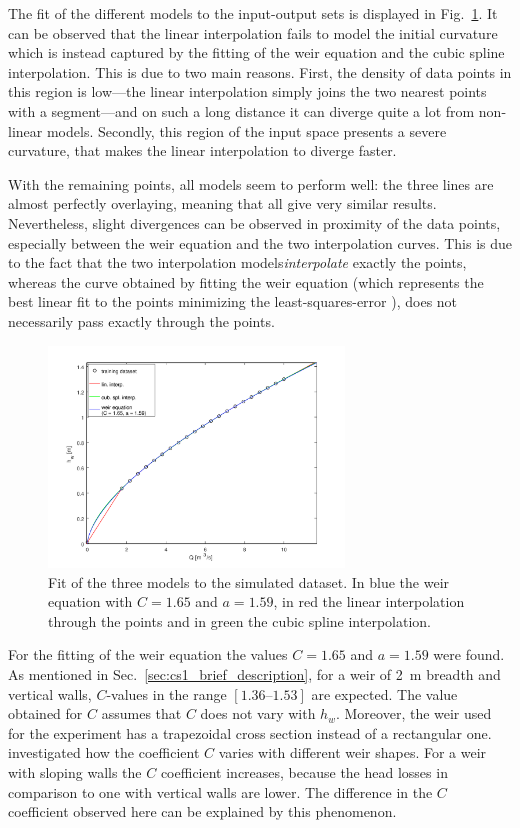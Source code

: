 The fit of the different models to the input-output sets is displayed in Fig.~\ref{fig:fitting_results}.
It can be observed that the linear interpolation fails to model the initial curvature which is instead captured by the fitting of the weir equation and the cubic spline interpolation.
This is due to two main reasons. 
First, the density of data points in this region is low---the linear interpolation simply joins the two nearest points with a segment---and on such a long distance it can diverge quite a lot from non-linear models.
Secondly, this region of the input space presents a severe curvature, that makes the linear interpolation to diverge faster.

With the remaining points, all models seem to perform well: the three lines are almost perfectly overlaying, meaning that all give very similar results.
Nevertheless, slight divergences can be observed in proximity of the data points, especially between the weir equation and the two interpolation curves. This is due to the fact that the two interpolation models\emph{interpolate} exactly the points, whereas the curve obtained by fitting the weir equation (which represents the best linear fit to the points minimizing the least-squares-error ), does not necessarily pass exactly through the points.

\begin{figure}[h]
  \centering
  \includegraphics[width=0.7\textwidth]{Figures/fitting_results.png}
  \caption{Fit of the three models to the simulated dataset. In blue the weir equation with $C = \num{1.65}$ and $a = \num{1.59}$, in red the linear interpolation through the points and in green the cubic spline interpolation.}
  \label{fig:fitting_results}
\end{figure}

For the fitting of the weir equation the values $C = 1.65$ and $a = 1.59$ were found.
As mentioned in Sec.~\ref{sec:cs1_brief_description}, for a weir of \SI{2}{\m} breadth and vertical walls, $C$-values in the range $[\numrange{1.36}{1.53}]$ are expected.
The value obtained for $C$ assumes that $C$ does not vary with $h_w$.
Moreover, the weir used for the experiment has a trapezoidal cross section instead of a rectangular one.
\cite{tracy_discharge_1957} investigated how the coefficient $C$ varies with different weir shapes.
For a weir with sloping walls the $C$ coefficient increases, because the head losses in comparison to one with vertical walls are lower.
The difference in the $C$ coefficient observed here can be explained by this phenomenon.\\

